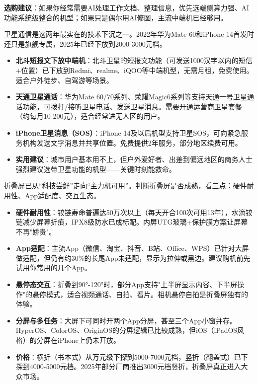 \textbf{选购建议}：如果你经常需要AI处理工作文档、整理信息，优先选端侧算力强、AI功能系统级整合的机型；如果只是偶尔用AI修图，主流中端机已经够用。


卫星通信是这两年最实在的技术下沉之一。2022年华为Mate 60和iPhone 14首发时还只是旗舰专属，2025年已经下放到2000-3000元档。

\begin{itemize}
  \item \textbf{北斗短报文下放中端机}：北斗卫星的短报文功能（可发送1000汉字以内的短信+位置）已下放到Redmi、realme、iQOO等中端机型，无需月租，免费使用。适合户外徒步、自驾游等场景。
  \item \textbf{天通卫星通话}：华为Mate 60/70系列、荣耀Magic6系列等支持天通一号卫星通话功能，可拨打/接听卫星电话、发送卫星消息。需要开通运营商卫星套餐（约每月10-200元），适合经常进无人区的用户。
  \item \textbf{iPhone卫星消息（SOS）}：iPhone 14及以后机型支持卫星SOS，可向紧急服务机构发送文字消息并共享位置。免费提供2年服务，部分地区续费可用。
  \item \textbf{实用建议}：城市用户基本用不上，但户外爱好者、出差到偏远地区的商务人士强烈建议选带卫星功能的机型——关键时刻能救命。
\end{itemize}


折叠屏已从“科技尝鲜”走向“主力机可用”。判断折叠屏是否成熟，看三点：硬件耐用性、App适配度、交互生态。

\begin{itemize}
  \item \textbf{硬件耐用性}：铰链寿命普遍达50万次以上（每天开合100次可用13年），水滴铰链减少屏幕折痕，IPX8级防水已成标配。内屏UTG玻璃+保护膜方案让屏幕不再"娇贵"。
  \item \textbf{App适配}：主流App（微信、淘宝、抖音、B站、Office、WPS）已针对大屏做适配，但仍有约30\%的长尾App未适配，显示为拉伸或黑边。建议购机前先试用你常用的几个App。
  \item \textbf{悬停态交互}：折叠到90°-120°时，部分App支持"上半屏显示内容、下半屏操作"的悬停模式，适合视频通话、自拍、看片。相机悬停自拍是折叠屏独有的体验。
  \item \textbf{分屏与多任务}：大屏下可同时开两个App分屏，甚至三个App小窗并存。HyperOS、ColorOS、OriginOS的分屏逻辑已比较成熟，但iOS（iPadOS风格）的分屏在iPhone上仍未开放。
  \item \textbf{价格}：横折（书本式）从万元级下探到5000-7000元档，竖折（翻盖式）已下探到4000-5000元档。2025年部分厂商推出3000元档竖折，折叠屏真正进入大众市场。
\end{itemize}

